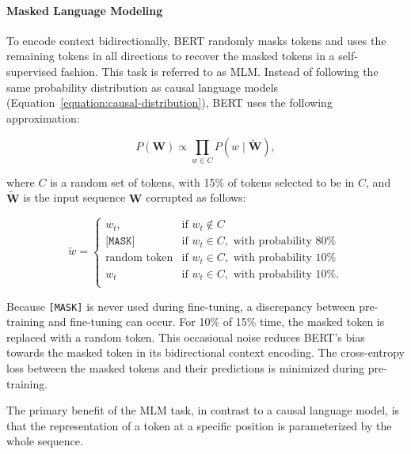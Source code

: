 \paragraph{Masked Language Modeling}

To encode context bidirectionally, \ac{BERT} randomly masks tokens and uses the remaining tokens in all directions to recover the masked tokens in a self-supervised fashion. This task is referred to as \ac{MLM}. Instead of following the same probability distribution as causal language models (Equation~\ref{equation:causal-distribution}), \ac{BERT} uses the following approximation:

\begin{equation}
    P(\bm{W}) \propto \prod_{w \in C}P\left(w \mid \tilde{\bm{W}}\right),
\end{equation}

where $C$ is a random set of tokens, with 15\% of tokens selected to be in $C$, and $\tilde{\bm{W}}$ is the input sequence $\bm{W}$ corrupted as follows:

\begin{equation}
    \tilde{w} = 
\begin{cases}
    w_t,               & \text{if } w_t \notin C\\
    \texttt{[MASK]}       & \text{if } w_t \in C, \text{ with probability 80\%} \\
    \text{random token}       & \text{if } w_t \in C, \text{ with probability 10\%} \\
    w_t       & \text{if } w_t \in C, \text{ with probability 10\%.} \\
\end{cases}
\end{equation}

Because \texttt{[MASK]} is never used during fine-tuning, a discrepancy between pre-training and fine-tuning can occur. For 10\% of 15\% time, the masked token is replaced with a random token. This occasional noise reduces \ac{BERT}'s bias towards the masked token in its bidirectional context encoding. The cross-entropy loss between the masked tokens and their predictions is minimized during pre-training.

The primary benefit of the \ac{MLM} task, in contrast to a causal language model, is that the representation of a token at a specific position is parameterized by the whole sequence.


